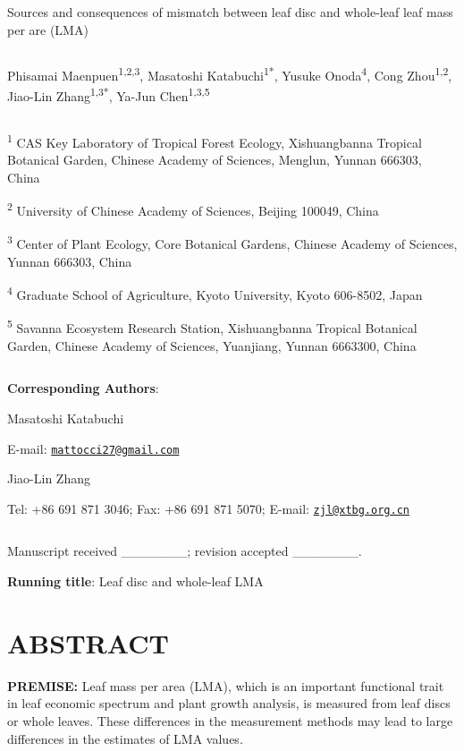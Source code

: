 \documentclass[
  12pt,
  a4paper,
,tablecaptionabove
]{scrartcl}
\date{}
\title{}
\author{}
\begin{document}




Sources and consequences of mismatch between leaf disc and whole-leaf leaf mass per are (LMA)

\[ \]

Phisamai Maenpuen\textsuperscript{1,2,3},
Masatoshi Katabuchi\textsuperscript{1*},
Yusuke Onoda\textsuperscript{4},
Cong Zhou\textsuperscript{1,2},
Jiao-Lin Zhang\textsuperscript{1,3*},
Ya-Jun Chen\textsuperscript{1,3,5}

\[ \]

\textsuperscript{1} CAS Key Laboratory of Tropical Forest Ecology, Xishuangbanna Tropical Botanical Garden, Chinese Academy of Sciences, Menglun, Yunnan 666303, China

\textsuperscript{2} University of Chinese Academy of Sciences, Beijing 100049, China

\textsuperscript{3} Center of Plant Ecology, Core Botanical Gardens, Chinese Academy of Sciences, Yunnan 666303, China

\textsuperscript{4} Graduate School of Agriculture, Kyoto University, Kyoto 606-8502, Japan

\textsuperscript{5} Savanna Ecosystem Research Station, Xishuangbanna Tropical Botanical Garden, Chinese Academy of Sciences, Yuanjiang, Yunnan 6663300, China

\[ \]

\textbf{Corresponding Authors}:

Masatoshi Katabuchi

E-mail: \href{mailto:mattocci27@gmail.com}{\nolinkurl{mattocci27@gmail.com}}

Jiao-Lin Zhang

Tel: +86 691 871 3046;
Fax: +86 691 871 5070;
E-mail: \href{mailto:zjl@xtbg.org.cn}{\nolinkurl{zjl@xtbg.org.cn}}

\[ \]

Manuscript received \_\_\_\_\_\_\_; revision accepted \_\_\_\_\_\_\_.

\textbf{Running title}: Leaf disc and whole-leaf LMA

\newpage

\hypertarget{abstract}{%
\section{ABSTRACT}\label{abstract}}

\textbf{PREMISE:}
Leaf mass per area (LMA), which is an important functional trait in leaf economic spectrum and plant growth analysis, is measured from leaf discs or whole leaves.
These differences in the measurement methods may lead to large differences in the estimates of LMA values.
\end{document}
